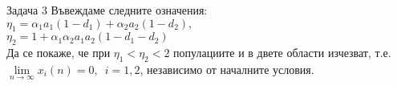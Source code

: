 \begin{frame}[t]{Задача 3}
Въвеждаме следните означения:\\
$\eta_{1} = \alpha_{1} a_{1} (1-d_{1}) + \alpha_{2} a_{2} (1-d_{2}),$ \\ 
$\eta_{2} = 1 + \alpha_{1} \alpha_{2} a_{1} a_{2} (1 - d_{1} - d_{2})$ \\
Да се покаже, че при $\eta_{1} < \eta_{2} < 2$ популациите и в двете области изчезват, т.е. $\lim\limits_{n \to \infty}x_{i}(n)=0, \enspace i=1,2$, независимо от началните условия.
\end{frame}